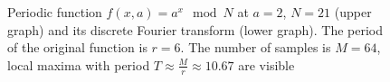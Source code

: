 \begin{figure}
\centering




\caption{Periodic function
  $f\left(x, a\right) = a^x \mod{N}$ at $a=2$, $N = 21$ (upper
  graph) and its discrete Fourier transform (lower graph).
  The period of the original function is $r = 6$. The number of samples is $M = 64$,
  local maxima with period $T \approx \frac{M}{r} \approx 10.67$ are visible}
\label{picAddFourierFourier}
\end{figure}